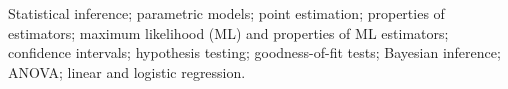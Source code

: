 Statistical inference; 
parametric models; 
point estimation; 
properties of estimators; 
maximum likelihood (ML) and properties of ML estimators; 
confidence intervals; 
hypothesis testing; 
goodness-of-fit tests; 
Bayesian inference; 
ANOVA; 
linear and logistic regression.